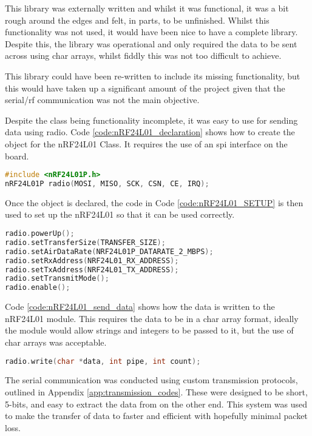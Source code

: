 \documentclass [11pt]{article}
\begin{document}
This library was externally written and whilst it was functional, it was a bit rough around the edges and felt, in parts, to be unfinished. Whilst this functionality was not used, it would have been nice to have a complete library. Despite this, the library was operational and only required the data to be sent across using char arrays, whilst fiddly this was not too difficult to achieve. 

This library could have been re-written to include its missing functionality, but this would have taken up a significant amount of the project given that the serial/\gls{rf} communication was not the main objective.     

Despite the class being functionality incomplete, it was easy to use for sending data using radio. Code \ref{code:nRF24L01_declaration} shows how to create the object for the nRF24L01 Class. It requires the use of an \gls{spi} interface on the board.  

\begin{lstlisting}[language=C++,label=code:nRF24L01_declaration,caption=nRF24L01 Class Constructor]
#include <nRF24L01P.h>
nRF24L01P radio(MOSI, MISO, SCK, CSN, CE, IRQ);
\end{lstlisting}

Once the object is declared, the code in Code \ref{code:nRF24L01_SETUP} is then used to set up the nRF24L01 so that it can be used correctly. 

\begin{lstlisting}[language=C++,label=code:nRF24L01_SETUP,caption=nRF24L01 Set Up Transmit Mode]
radio.powerUp();
radio.setTransferSize(TRANSFER_SIZE);
radio.setAirDataRate(NRF24L01P_DATARATE_2_MBPS);
radio.setRxAddress(NRF24L01_RX_ADDRESS);
radio.setTxAddress(NRF24L01_TX_ADDRESS);
radio.setTransmitMode();
radio.enable();
\end{lstlisting}

Code \ref{code:nRF24L01_send_data} shows how the data is written to the nRF24L01 module. This requires the data to be in a char array format, ideally the module would allow strings and integers to be passed to it, but the use of char arrays was acceptable.

\begin{lstlisting}[language=C++,label=code:nRF24L01_send_data,caption=Sending Data Using nRF24L01]
radio.write(char *data, int pipe, int count);
\end{lstlisting}

The serial communication was conducted using custom transmission protocols, outlined in Appendix \ref{app:transmission_codes}. These were designed to be short, 5-bits, and easy to extract the data from on the other end. This system was used to make the transfer of  data to faster and efficient with hopefully minimal packet loss.
\end{document}
